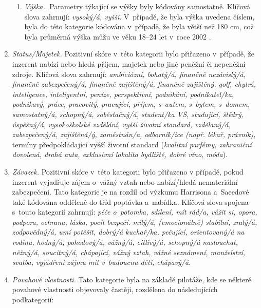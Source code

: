 \documentclass[a4paper, 12pt, notitlepage, oneside, numbers=noenddot]{report}
\begin{document}
\begin{enumerate}
\begin{enumerate}
\item \emph{Výška.}. Parametry týkající se výšky byly kódovány samostatně.
  Klíčová slova zahrnují: \emph{vysoký/á, vyšší}. V~případě, že byla výška
  uvedena číslem, byla do této kategorie kódována v~případě, že byla
  větší než 180 cm, což byla průměrná výška můžu ve věku 18--24 let
  v~roce 2002 \citep{UZIS2002}.
\end{enumerate}
\item \emph{Status/Majetek.} Pozitivní skóre v~této kategorii bylo přiřazeno
  v~případě, že inzerent nabízí nebo hledá příjem, majetek nebo jiné
  peněžní či nepeněžní zdroje. Klíčová slova zahrnují:
  \emph{ambiciózní, bohatý/á, finančně nezávislý/á, finančně
    zabezpečený/á, finančně zajištěný/á, finančně zajištěný, golf,
    chytrá, inteligence, inteligentní, peníze, perspektivní,
    podnikání, podnikatel/ka, podnikavý, práce, pracovitý, pracující,
    příjem, s~autem, s~bytem, s~domem, samostatný/á, schopný/á,
    soběstačný/á, student/ka VŠ, studující, štědrý, úspěšný/á,
    vysokoškolské vzdělání, vyšší životní standard, vzdě\-la\-ný/á,
    zabezpečený/á, zajištěná/ý, zaměstnán/a, odborník/ice (např.
    lékař, právník)}, termíny předpokládající vyšší životní standard
  (\emph{kvalitní parfémy, zahraniční dovolená, drahá auta, exklusivní
    lokalita bydliště, dobré víno, móda}).
\item \emph{Závazek.} Pozitivní skóre v~této kategorii bylo přiřazeno v
  případě, pokud inzerent vyjadřuje zájem o~vážný vztah nebo
  nabízí/hledá nemateriální zabezpečení. Tato ka\-te\-gorie je na rozdíl
  od výzkumu Harrisona a~Saeedové \citeyearpar{HarrisonSaeed1977} také kódována odděleně do
  tříd poptávka a~nabídka. Klíčová slova spojena s~touto kategorií
  zahrnují: \emph{péče o~potomka, sdílení, mít rád/a, vážit si, opora,
    podpora, ochrana, láska, pocit bezpečí. milý/á, (emocionálně)
    stabilní, zralý/á, zodpovědný/á, umí potěšit, dobrý/á ku\-chař/ka,
    pečující, orientovaný/á na rodinu, hodný/á, pohodový/á, vážný/á,
    citlivý/á, schopný/á naslouchat, něžný/á, soucitný/á, chápající,
    vážný vztah, vážné seznámení, manželství, svatba, vyjádření zájmu
    mít v~budoucnu děti, chápavý/á}.

\item \emph{Povahové vlastnosti.} Tato kategorie byla na základě pilotáže,
  kde se některé povahové vlastnosti objevovaly častěji, rozdělena do
  následujících podkategorií:


\end{enumerate}
\end{document}

